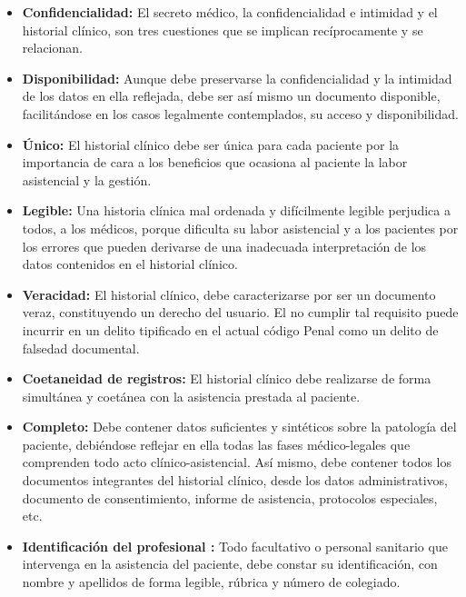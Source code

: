 \begin{itemize}
\item \textbf{Confidencialidad:} El secreto médico, la confidencialidad e intimidad y el historial clínico, son tres cuestiones que se implican recíprocamente y se relacionan.
            
\item \textbf{Disponibilidad:} Aunque debe preservarse la confidencialidad y la intimidad de los datos en ella reflejada, debe ser así mismo un documento disponible, facilitándose en los casos legalmente contemplados, su acceso y disponibilidad. 
            
\item \textbf{Único:} El historial clínico debe ser única para cada paciente por la importancia de cara a los beneficios que ocasiona al paciente la labor asistencial y la gestión.
             
\item \textbf{Legible:} Una historia clínica mal ordenada y difícilmente legible perjudica a todos, a los médicos, porque dificulta su labor asistencial y a los pacientes por los errores que pueden derivarse de una inadecuada interpretación de los datos contenidos en el historial clínico.
            
\item \textbf{Veracidad:} El historial clínico, debe caracterizarse por ser un documento veraz, constituyendo un derecho del usuario. El no cumplir tal requisito puede incurrir en un delito tipificado en el actual código Penal como un delito de falsedad documental.
            
\item \textbf{Coetaneidad de registros:} El historial clínico debe realizarse de forma simultánea y coetánea con la asistencia prestada al paciente.
            
\item \textbf{Completo:} Debe contener datos suficientes y sintéticos sobre la patología del paciente, debiéndose reflejar en ella todas las fases médico-legales que comprenden todo acto clínico-asistencial. Así mismo, debe contener todos los documentos integrantes del historial clínico, desde los datos administrativos, documento de consentimiento, informe de asistencia, protocolos especiales, etc.
             
\item \textbf{Identificación del profesional :} Todo facultativo o personal sanitario que intervenga en la asistencia del paciente, debe constar su identificación, con nombre y apellidos de forma legible, rúbrica y número de colegiado.
\end{itemize}

